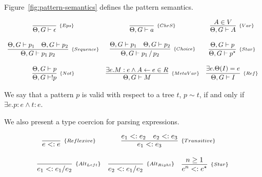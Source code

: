 Figure~\ref{fig:pattern-semantics} defines the pattern semantics.

\begin{figure*}[!ht]
    \centering
    \[
        \begin{array}{ccc}
            \infer[_{\{Eps\}}]{\Theta, G \vdash \epsilon}{} &
            \infer[_{\{ChrS\}}]{\Theta, G \vdash a}{} &
            \infer[_{\{Var\}}]{\Theta, G \vdash A}{A \in V}
            \\ \\
            \infer[_{\{Sequence\}}]{\Theta, G \vdash p_1\:p_2}{\Theta, G \vdash p_1 & \Theta, G \vdash p_2} &
            \infer[_{\{Choice\}}]{\Theta, G \vdash p_1 \,/\, p_2}{\Theta, G \vdash p_1 & \Theta, G \vdash p_2} &
            \infer[_{\{Star\}}]{\Theta, G \vdash p^\star}{\Theta, G \vdash p} 
            \\ \\
            \infer[_{\{Not\}}]{\Theta, G \vdash !p}{\Theta, G \vdash p} &
            \infer[_{\{MetaVar\}}]{\Theta, G \vdash M}{\exists e. M : e \land A \leftarrow e \in R} &
            \infer[_{\{Ref\}}]{\Theta, G \vdash I}{\exists e. \Theta(I) = e}
        \end{array}
    \]
    \caption{Pattern expressions semantics.}
    \label{fig:pattern-semantics}
\end{figure*}

\begin{definition}
    We say that a pattern \(p\) is valid with respect to a tree \(t\), \(p \sim t\),
    if and only if \(\exists e . p : e \land t : e\).
\end{definition}

We also present a type coercion for parsing expressions.
\begin{figure*}[ht]
    \[
        \begin{array}{ccc}
            \infer[_{\{Reflexive\}}]{e <: e}{} &
            \multicolumn{2}{c}{
                \infer[_{\{Transitive\}}]{e_1 <: e_3}{e_1 <: e_2 & e_2 <: e_3}
            } \\ \\

            \infer[_{\{Alt_{Left}\}}]{e_1 <: e_1 / e_2}{} &
            \infer[_{\{Alt_{Right}\}}]{e_2 <: e_1 / e_2}{} &
            \infer[_{\{Star\}}]{e^n <: e^\star}{n \geq 1} 
        \end{array}
    \]
    \centering
    \caption{Subtype relations for parsing expressions}
    \label{fig:subtype-relations}
\end{figure*}

